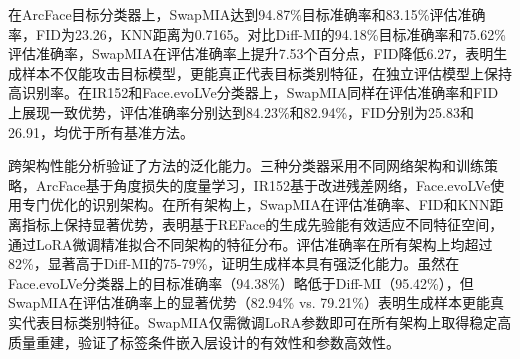 \begin{table}[htbp]
  \centering
  \caption{不同目标分类器下的MIA攻击性能对比}
  \label{tab:mia_sota_comparison}
\end{table}

在ArcFace目标分类器上，SwapMIA达到94.87\%目标准确率和83.15\%评估准确率，FID为23.26，KNN距离为0.7165。对比Diff-MI的94.18\%目标准确率和75.62\%评估准确率，SwapMIA在评估准确率上提升7.53个百分点，FID降低6.27，表明生成样本不仅能攻击目标模型，更能真正代表目标类别特征，在独立评估模型上保持高识别率。在IR152和Face.evoLVe分类器上，SwapMIA同样在评估准确率和FID上展现一致优势，评估准确率分别达到84.23\%和82.94\%，FID分别为25.83和26.91，均优于所有基准方法。

跨架构性能分析验证了方法的泛化能力。三种分类器采用不同网络架构和训练策略，ArcFace基于角度损失的度量学习，IR152基于改进残差网络，Face.evoLVe使用专门优化的识别架构。在所有架构上，SwapMIA在评估准确率、FID和KNN距离指标上保持显著优势，表明基于REFace的生成先验能有效适应不同特征空间，通过LoRA微调精准拟合不同架构的特征分布。评估准确率在所有架构上均超过82\%，显著高于Diff-MI的75-79\%，证明生成样本具有强泛化能力。虽然在Face.evoLVe分类器上的目标准确率（94.38\%）略低于Diff-MI（95.42\%），但SwapMIA在评估准确率上的显著优势（82.94\% vs. 79.21\%）表明生成样本更能真实代表目标类别特征。SwapMIA仅需微调LoRA参数即可在所有架构上取得稳定高质量重建，验证了标签条件嵌入层设计的有效性和参数高效性。

